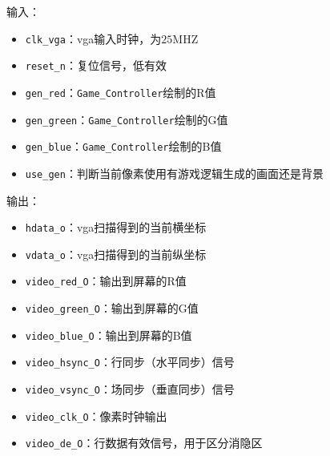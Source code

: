 输入：
\begin{itemize}
    \item \texttt{clk\_vga}：vga输入时钟，为$25 \text{MHZ}$
    \item \texttt{reset\_n}：复位信号，低有效
    \item \texttt{gen\_red}：\texttt{Game\_Controller}绘制的R值
    \item \texttt{gen\_green}：\texttt{Game\_Controller}绘制的G值
    \item \texttt{gen\_blue}：\texttt{Game\_Controller}绘制的B值
    \item \texttt{use\_gen}：判断当前像素使用有游戏逻辑生成的画面还是背景
\end{itemize}

输出：
\begin{itemize}
    \item \texttt{hdata\_o}：vga扫描得到的当前横坐标
    \item \texttt{vdata\_o}：vga扫描得到的当前纵坐标
    \item \texttt{video\_red\_O}：输出到屏幕的R值
    \item \texttt{video\_green\_O}：输出到屏幕的G值
    \item \texttt{video\_blue\_O}：输出到屏幕的B值
    \item \texttt{video\_hsync\_O}：行同步（水平同步）信号
    \item \texttt{video\_vsync\_O}：场同步（垂直同步）信号
    \item \texttt{video\_clk\_O}：像素时钟输出
    \item \texttt{video\_de\_O}：行数据有效信号，用于区分消隐区
\end{itemize}
